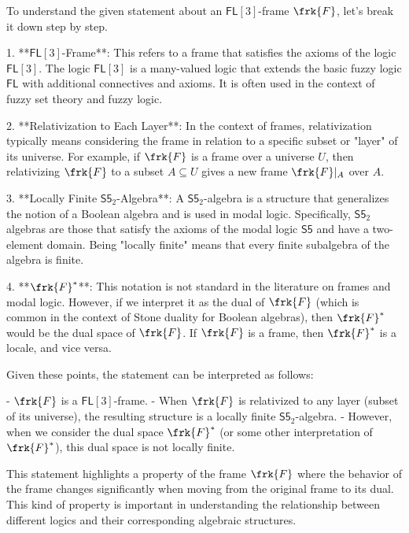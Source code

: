 To understand the given statement about an \(\mathsf{FL}[3]\)-frame \(\frk{F}\), let's break it down step by step.

1. **\(\mathsf{FL}[3]\)-Frame**: This refers to a frame that satisfies the axioms of the logic \(\mathsf{FL}[3]\). The logic \(\mathsf{FL}[3]\) is a many-valued logic that extends the basic fuzzy logic \(\mathsf{FL}\) with additional connectives and axioms. It is often used in the context of fuzzy set theory and fuzzy logic.

2. **Relativization to Each Layer**: In the context of frames, relativization typically means considering the frame in relation to a specific subset or "layer" of its universe. For example, if \(\frk{F}\) is a frame over a universe \(U\), then relativizing \(\frk{F}\) to a subset \(A \subseteq U\) gives a new frame \(\frk{F}|_A\) over \(A\).

3. **Locally Finite \(\mathsf{S5}_2\)-Algebra**: A \(\mathsf{S5}_2\)-algebra is a structure that generalizes the notion of a Boolean algebra and is used in modal logic. Specifically, \(\mathsf{S5}_2\) algebras are those that satisfy the axioms of the modal logic \(\mathsf{S5}\) and have a two-element domain. Being "locally finite" means that every finite subalgebra of the algebra is finite.

4. **\(\frk{F}^*\)**: This notation is not standard in the literature on frames and modal logic. However, if we interpret it as the dual of \(\frk{F}\) (which is common in the context of Stone duality for Boolean algebras), then \(\frk{F}^*\) would be the dual space of \(\frk{F}\). If \(\frk{F}\) is a frame, then \(\frk{F}^*\) is a locale, and vice versa.

Given these points, the statement can be interpreted as follows:

- \(\frk{F}\) is a \(\mathsf{FL}[3]\)-frame.
- When \(\frk{F}\) is relativized to any layer (subset of its universe), the resulting structure is a locally finite \(\mathsf{S5}_2\)-algebra.
- However, when we consider the dual space \(\frk{F}^*\) (or some other interpretation of \(\frk{F}^*\)), this dual space is not locally finite.

This statement highlights a property of the frame \(\frk{F}\) where the behavior of the frame changes significantly when moving from the original frame to its dual. This kind of property is important in understanding the relationship between different logics and their corresponding algebraic structures.